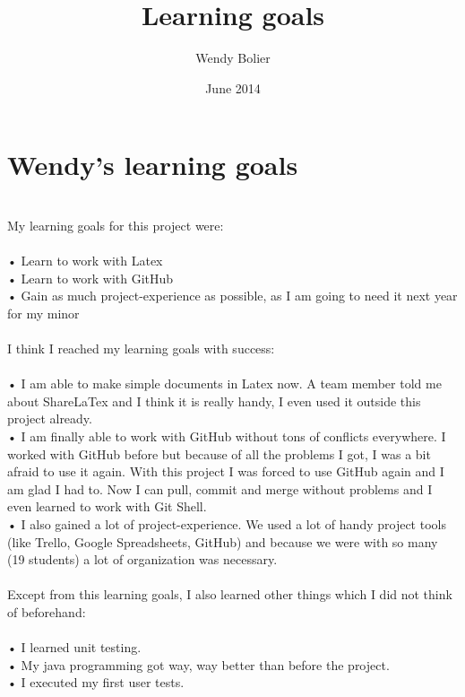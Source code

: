 \documentclass{article}
\title{Learning goals}
\author{Wendy Bolier}
\date{June 2014}
\begin{document}
\maketitle

\section{Wendy's learning goals}
\\

My learning goals for this project were:\\
\\
• Learn to work with Latex\\
• Learn to work with GitHub \\
• Gain as much project-experience as possible, as I am going to need it next year for my minor\\
\\
I think I reached my learning goals with success:\\
\\
• I am able to make simple documents in Latex now. A team member told me about ShareLaTex and I think it is really handy, I even used it outside this project already.\\
• I am finally able to work with GitHub without tons of conflicts everywhere. I worked with GitHub before but because of all the problems I got, I was a bit afraid to use it again. With this project I was forced to use GitHub again and I am glad I had to. Now I can pull, commit and merge without problems and I even learned to work with Git Shell. \\
• I also gained a lot of project-experience. We used a lot of handy project tools (like Trello, Google Spreadsheets, GitHub) and because we were with so many (19 students) a lot of organization was necessary. \\
\\
Except from this learning goals, I also learned other things which I did not think of beforehand: \\
\\
• I learned unit testing.\\
• My java programming got way, way better than before the project.\\
• I executed my first user tests.\\
\end{document}
